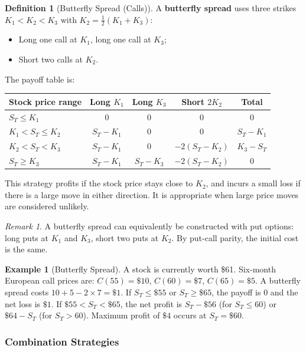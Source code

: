 \documentclass[12pt, a4paper]{article}
\theoremstyle{plain}
\theoremstyle{definition}
\newtheorem{definition}[theorem]{Definition}
\newtheorem{example}[theorem]{Example}
\theoremstyle{remark}
\newtheorem{remark}[theorem]{Remark}
\begin{document}
\begin{definition}[Butterfly Spread (Calls)]
  A \textbf{butterfly spread} uses three strikes $K_1 < K_2 < K_3$ with $K_2 = \tfrac{1}{2}(K_1+K_3)$:
  \begin{itemize}
    \item Long one call at $K_1$, long one call at $K_3$;
    \item Short two calls at $K_2$.
  \end{itemize}
  The payoff table is:
  \begin{center}
  \begin{tabular}{lccc c}
    \hline
    Stock price range & Long $K_1$ & Long $K_3$ & Short $2K_2$ & Total \\
    \hline
    $S_T \leq K_1$ & $0$ & $0$ & $0$ & $0$ \\
    $K_1 < S_T \leq K_2$ & $S_T-K_1$ & $0$ & $0$ & $S_T - K_1$ \\
    $K_2 < S_T < K_3$ & $S_T-K_1$ & $0$ & $-2(S_T-K_2)$ & $K_3 - S_T$ \\
    $S_T \geq K_3$ & $S_T-K_1$ & $S_T-K_3$ & $-2(S_T-K_2)$ & $0$ \\
    \hline
  \end{tabular}
  \end{center}
  This strategy profits if the stock price stays close to $K_2$, and incurs a small loss if there is a large move in either direction. It is appropriate when large price moves are considered unlikely.
\end{definition}

\begin{remark}
  A butterfly spread can equivalently be constructed with put options: long puts at $K_1$ and $K_3$, short two puts at $K_2$. By put-call parity, the initial cost is the same.
\end{remark}

\begin{example}[Butterfly Spread]
  A stock is currently worth \$61. Six-month European call prices are: $C(55) = \$10$, $C(60) = \$7$, $C(65) = \$5$. A butterfly spread costs $10 + 5 - 2\times 7 = \$1$. If $S_T \leq \$55$ or $S_T \geq \$65$, the payoff is $0$ and the net loss is $\$1$. If $\$55 < S_T < \$65$, the net profit is $S_T - \$56$ (for $S_T \leq 60$) or $\$64 - S_T$ (for $S_T > 60$). Maximum profit of $\$4$ occurs at $S_T = \$60$.
\end{example}

\subsubsection{Combination Strategies}
\end{document}
